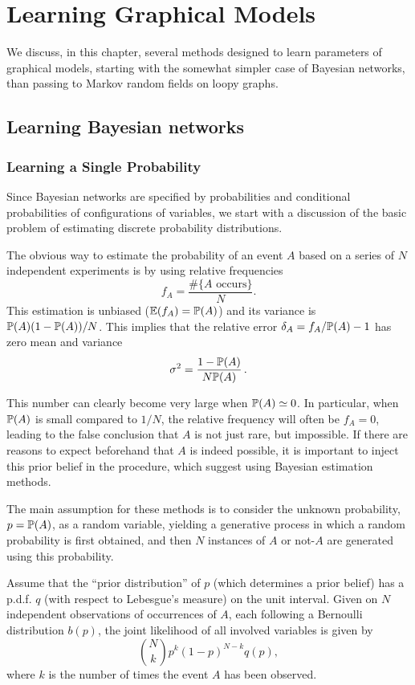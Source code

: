 

\chapter{Learning Graphical Models}
\label{chap:learning.graphical}
We discuss, in this chapter, several methods designed to learn parameters of graphical models, starting with the somewhat simpler case of Bayesian networks, than passing to Markov random fields on loopy graphs. 


\section{Learning Bayesian networks}
\label{sec:graph.estim}

\subsection{Learning a Single Probability}
Since Bayesian networks are specified by probabilities and conditional
probabilities of configurations of variables, we start with a
discussion of the basic problem of estimating discrete
probability distributions.

The obvious way to estimate the probability of an event $A$ based on a
series of $N$ independent experiments is by using relative
frequencies
$$
f_A = \frac{\# \{A \text{ occurs}\}}{N}.
$$
This estimation is unbiased ($\bm{\mathbb E}(f_A) = \bm{\mathbb P}(A)$) and its variance is
$\bm{\mathbb P}(A)(1-\bm{\mathbb P}(A))/N$. This implies that the relative error
$\delta_A = f_A/\bm{\mathbb P}(A) -1$ has zero mean and variance
$$
\sigma^2 = \frac{1-\bm{\mathbb P}(A)}{N\bm{\mathbb P}(A)}\,.
$$

This number can clearly become very large when $\bm{\mathbb P}(A) \simeq 0$. In particular,
when $\bm{\mathbb P}(A)$ is small compared to $1/N$, the relative frequency 
will often be $f_A = 0$, leading to the false conclusion that $A$ is not just rare, but
impossible. 
If there are reasons to expect beforehand that $A$ is indeed possible, it is
important to inject this prior belief in the procedure, which suggest using  Bayesian estimation methods.

The main assumption for these methods is to consider the unknown
probability, $p=\bm{\mathbb P}(A)$, as a random variable, yielding a generative
process in which a random probability is first obtained, and then $N$
instances of $A$ or not-$A$ are generated using this probability.

Assume that the ``prior distribution'' of $p$ (which determines a prior belief) has a p.d.f. $q$ (with respect to Lebesgue's measure) on the unit interval. Given on
$N$ independent observations of occurrences of $A$, each following a
Bernoulli distribution $b(p)$, the joint likelihood of all involved variables is given
by
\[
 \binom{N}{k} p^k(1-p)^{N-k} q(p),
\]
where $k$ is the number of times the event $A$ has been observed.

